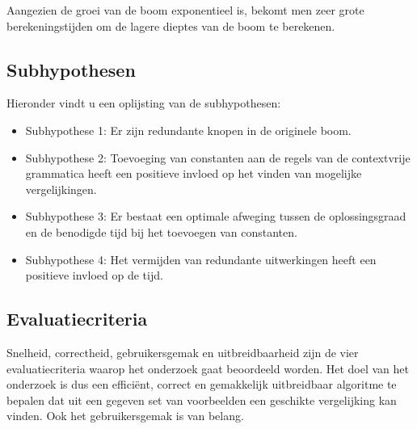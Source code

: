 \documentclass[Main.tex]{subfiles}
\begin{document}
Aangezien de groei van de boom exponentieel is, bekomt men zeer grote berekeningstijden om de lagere dieptes van de boom te berekenen. 

\subsection{Subhypothesen} \label{ssec:subhypothesen}
\par Hieronder vindt u een oplijsting van de subhypothesen:

\begin{itemize}
\item Subhypothese 1: Er zijn redundante knopen in de originele boom.
\item Subhypothese 2: Toevoeging van constanten aan de regels van de contextvrije grammatica heeft een positieve invloed op het vinden van mogelijke vergelijkingen.
\item Subhypothese 3: Er bestaat een optimale afweging tussen de oplossingsgraad en de benodigde tijd bij het toevoegen van constanten.
\item Subhypothese 4: Het vermijden van redundante uitwerkingen heeft een positieve invloed op de tijd. 
\end{itemize}

\subsection{Evaluatiecriteria}

Snelheid, correctheid, gebruikersgemak en uitbreidbaarheid zijn de vier evaluatiecriteria waarop het onderzoek gaat beoordeeld worden. Het doel van het onderzoek is dus een effici\"ent, correct en gemakkelijk uitbreidbaar algoritme te bepalen dat uit een gegeven set van voorbeelden een geschikte vergelijking kan vinden. Ook het gebruikersgemak is van belang.
\end{document}
